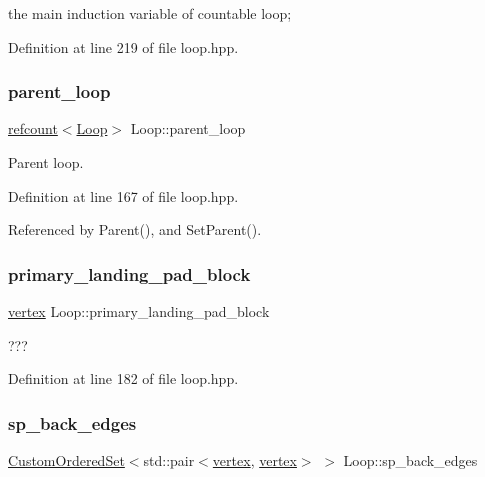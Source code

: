 the main induction variable of countable loop; 



Definition at line 219 of file loop.\+hpp.

\mbox{\label{classLoop_a5c7792deff68092ff3ccf7017da15ee7}} 
\subsubsection{\texorpdfstring{parent\+\_\+loop}{parent\_loop}}
{\footnotesize\ttfamily \hyperlink{structrefcount}{refcount}$<$\hyperlink{classLoop}{Loop}$>$ Loop\+::parent\+\_\+loop\hspace{0.3cm}{\ttfamily [private]}}



Parent loop. 



Definition at line 167 of file loop.\+hpp.



Referenced by Parent(), and Set\+Parent().

\mbox{\label{classLoop_aaffc670c934b658baa60f714abf65d40}} 
\subsubsection{\texorpdfstring{primary\+\_\+landing\+\_\+pad\+\_\+block}{primary\_landing\_pad\_block}}
{\footnotesize\ttfamily \hyperlink{graph_8hpp_abefdcf0544e601805af44eca032cca14}{vertex} Loop\+::primary\+\_\+landing\+\_\+pad\+\_\+block\hspace{0.3cm}{\ttfamily [private]}}



??? 



Definition at line 182 of file loop.\+hpp.

\mbox{\label{classLoop_a046deb584fe101be74d6a458e5cfe369}} 
\subsubsection{\texorpdfstring{sp\+\_\+back\+\_\+edges}{sp\_back\_edges}}
{\footnotesize\ttfamily \hyperlink{classCustomOrderedSet}{Custom\+Ordered\+Set}$<$std\+::pair$<$\hyperlink{graph_8hpp_abefdcf0544e601805af44eca032cca14}{vertex}, \hyperlink{graph_8hpp_abefdcf0544e601805af44eca032cca14}{vertex}$>$ $>$ Loop\+::sp\+\_\+back\+\_\+edges\hspace{0.3cm}{\ttfamily [private]}}



